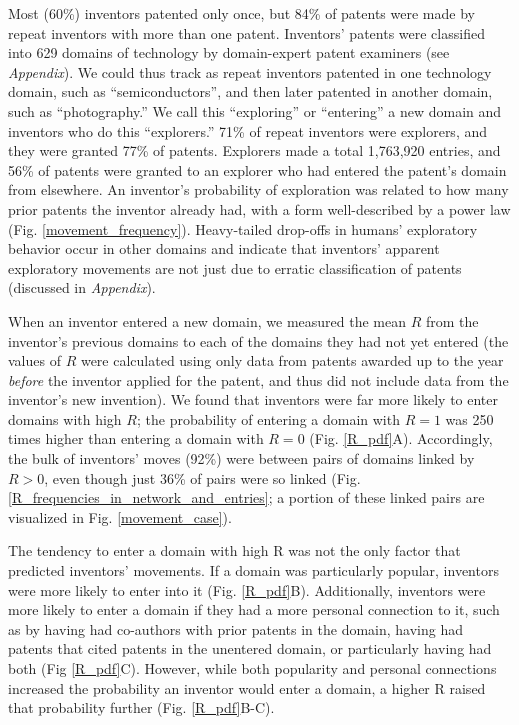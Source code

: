 \documentclass{dsj}
\begin{document}
Most (60\%) inventors patented only once, but 84\% of patents were made by repeat inventors with more than one patent. Inventors' patents were classified into 629 domains of technology by domain-expert patent examiners (see \textit{Appendix}). We could thus track as repeat inventors patented in one technology domain, such as ``semiconductors'', and then later patented in another domain, such as ``photography.'' We call this ``exploring'' or ``entering'' a new domain and inventors who do this ``explorers.'' 71\% of repeat inventors were explorers, and they were granted 77\% of patents. Explorers made a total 1,763,920 entries, and 56\% of patents were granted to an explorer who had entered the patent's domain from elsewhere. An inventor's probability of exploration was related to how many prior patents the inventor already had, with a form well-described by a power law 
(Fig. \ref{movement_frequency}). Heavy-tailed drop-offs in humans' exploratory behavior occur in other domains \cite{Brockmann2006,Deville2016} and indicate that inventors' apparent exploratory movements are not just due to erratic classification of patents (discussed in \textit{Appendix}).


When an inventor entered a new domain, we measured the mean $R$ from the inventor's previous domains to each of the domains they had not yet entered (the values of $R$ were calculated using only data from patents awarded up to the year \textit{before} the inventor applied for the patent, and thus did not include data from the inventor’s new invention). We found that inventors were far more likely to enter domains with high $R$; the probability of entering a domain with $R=1$ was 250 times higher than entering a domain with $R=0$ (Fig. \ref{R_pdf}A). Accordingly, the bulk of inventors' moves (92\%) were between pairs of domains linked by $R>0$, even though just 36\% of pairs were so linked (Fig. \ref{R_frequencies_in_network_and_entries}; a portion of these linked pairs are visualized in Fig. \ref{movement_case}). 

The tendency to enter a domain with high R was not the only factor that predicted inventors’ movements. If a domain was particularly popular, inventors were more likely to enter into it (Fig. \ref{R_pdf}B). Additionally, inventors were more likely to enter a domain if they had a more personal connection to it, such as by having had co-authors with prior patents in the domain, having had patents that cited patents in the unentered domain, or particularly having had both (Fig \ref{R_pdf}C). However, while both popularity and personal connections increased the probability an inventor would enter a domain, a higher R raised that probability further (Fig. \ref{R_pdf}B-C). 
\end{document}

